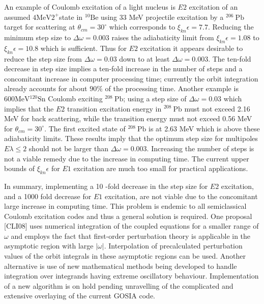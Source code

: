 \documentclass[10pt]{article}
\begin{document}
An example of Coulomb excitation of a light nucleus is $E 2$ excitation of an assumed $4 \mathrm{MeV} 2^{+}$state in ${ }^{10} \mathrm{Be}$ using 33 MeV projectile excitation by a ${ }^{206} \mathrm{~Pb}$ target for scattering at $\theta_{c m}=30^{\circ}$ which corresponds to $\xi_{k n} \epsilon=7.7$. Reducing the minimum step size to $\Delta \omega=0.003$ raises the adiabaticity limit from $\xi_{k n} \epsilon=1.08$ to $\xi_{k n} \epsilon=10.8$ which is sufficient. Thus for $E 2$ excitation it appears desirable to reduce the step size from $\Delta \omega=0.03$ down to at least $\Delta \omega=0.003$. The ten-fold decrease in step size implies a ten-fold increase in the number of steps and a concomitant increase in computer processing time; currently the orbit integration already accounts for about $90 \%$ of the processing time. Another example is $600 \mathrm{MeV}{ }^{120} \mathrm{Sn}$ Coulomb exciting ${ }^{208} \mathrm{~Pb}$; using a step size of $\Delta \omega=0.03$ which implies that the $E 2$ transition excitation energy in ${ }^{208} \mathrm{~Pb}$ must not exceed 2.16 MeV for back scattering, while the transition energy must not exceed 0.56 MeV for $\theta_{c m}=30^{\circ}$. The first excited state of ${ }^{208} \mathrm{~Pb}$ is at 2.63 MeV which is above these adiabaticity limits. These results imply that the optimum step size for multipoles $E \lambda \leq 2$ should not be larger than $\Delta \omega=0.003$. Increasing the number of steps is not a viable remedy due to the increase in computing time. The current upper bounds of $\xi_{k n} \epsilon$ for $E 1$ excitation are much too small for practical applications.

In summary, implementing a 10 -fold decrease in the step size for $E 2$ excitation, and a 1000 fold decrease for $E 1$ excitation, are not viable due to the concomitant large increase in computing time. This problem is endemic to all semiclassical Coulomb excitation codes and thus a general solution is required. One proposal [CLI08] uses numerical integration of the coupled equations for a smaller range of $\omega$ and employs the fact that first-order perturbation theory is applicable in the asymptotic region with large $|\omega|$. Interpolation of precalculated perturbation values of the orbit integrals in these asymptotic regions can be used. Another alternative is use of new mathematical methods being developed to handle integration over integrands having extreme oscillatory behaviour. Implementation of a new algorithm is on hold pending unravelling of the complicated and extensive overlaying of the current GOSIA code.
\end{document}
